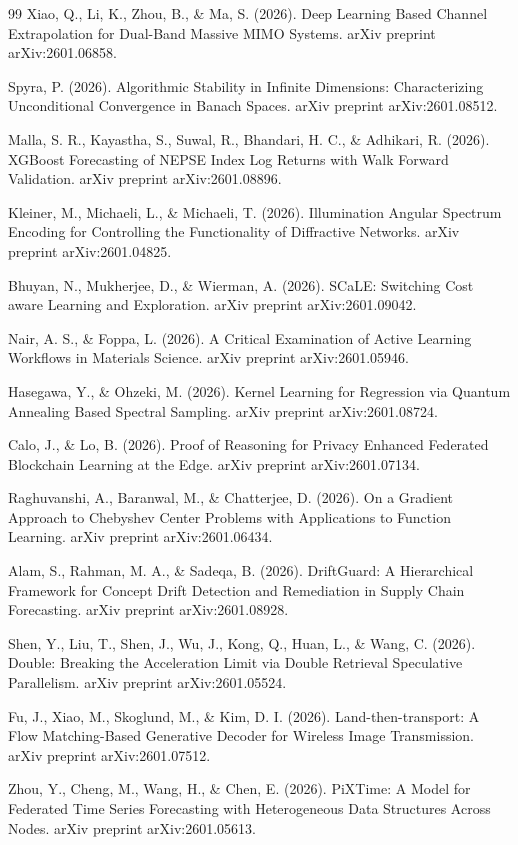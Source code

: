 \documentclass{article}
\begin{document}
\begin{thebibliography}{99}
Xiao, Q., Li, K., Zhou, B., \& Ma, S. (2026). Deep Learning Based Channel Extrapolation for Dual-Band Massive MIMO Systems. arXiv preprint arXiv:2601.06858.

Spyra, P. (2026). Algorithmic Stability in Infinite Dimensions: Characterizing Unconditional Convergence in Banach Spaces. arXiv preprint arXiv:2601.08512.

Malla, S. R., Kayastha, S., Suwal, R., Bhandari, H. C., \& Adhikari, R. (2026). XGBoost Forecasting of NEPSE Index Log Returns with Walk Forward Validation. arXiv preprint arXiv:2601.08896.

Kleiner, M., Michaeli, L., \& Michaeli, T. (2026). Illumination Angular Spectrum Encoding for Controlling the Functionality of Diffractive Networks. arXiv preprint arXiv:2601.04825.

Bhuyan, N., Mukherjee, D., \& Wierman, A. (2026). SCaLE: Switching Cost aware Learning and Exploration. arXiv preprint arXiv:2601.09042.

Nair, A. S., \& Foppa, L. (2026). A Critical Examination of Active Learning Workflows in Materials Science. arXiv preprint arXiv:2601.05946.

Hasegawa, Y., \& Ohzeki, M. (2026). Kernel Learning for Regression via Quantum Annealing Based Spectral Sampling. arXiv preprint arXiv:2601.08724.

Calo, J., \& Lo, B. (2026). Proof of Reasoning for Privacy Enhanced Federated Blockchain Learning at the Edge. arXiv preprint arXiv:2601.07134.

Raghuvanshi, A., Baranwal, M., \& Chatterjee, D. (2026). On a Gradient Approach to Chebyshev Center Problems with Applications to Function Learning. arXiv preprint arXiv:2601.06434.

Alam, S., Rahman, M. A., \& Sadeqa, B. (2026). DriftGuard: A Hierarchical Framework for Concept Drift Detection and Remediation in Supply Chain Forecasting. arXiv preprint arXiv:2601.08928.

Shen, Y., Liu, T., Shen, J., Wu, J., Kong, Q., Huan, L., \& Wang, C. (2026). Double: Breaking the Acceleration Limit via Double Retrieval Speculative Parallelism. arXiv preprint arXiv:2601.05524.

Fu, J., Xiao, M., Skoglund, M., \& Kim, D. I. (2026). Land-then-transport: A Flow Matching-Based Generative Decoder for Wireless Image Transmission. arXiv preprint arXiv:2601.07512.

Zhou, Y., Cheng, M., Wang, H., \& Chen, E. (2026). PiXTime: A Model for Federated Time Series Forecasting with Heterogeneous Data Structures Across Nodes. arXiv preprint arXiv:2601.05613.

\end{thebibliography}
\end{document}
